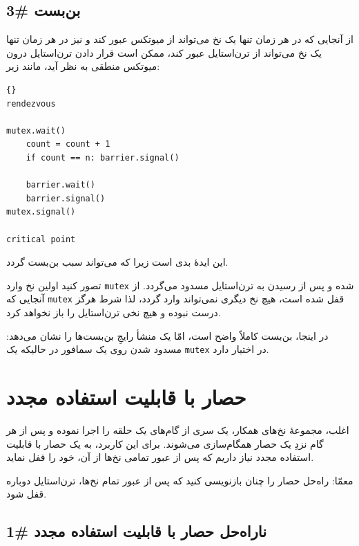 \documentclass{book}
\newcommand{\clearemptydoublepage}{\newpage\cleardoublepage}
\begin{document}
\clearemptydoublepage
\subsection {بن‌بست \#3}

    از آنجایی که در هر زمان تنها یک نخ می‌تواند از میوتکس عبور کند و نیز در هر زمان تنها یک نخ می‌تواند از ترن‌استایل عبور کند، 
    ممکن است قرار دادن ترن‌استایل درون میوتکس منطقی به نظر آید، مانند زیر: 
\begin{latin}
\begin{lstlisting}[title=\rl{راه حل بدِ حصار}]{}
rendezvous

mutex.wait()
    count = count + 1
    if count == n: barrier.signal()

    barrier.wait()
    barrier.signal()
mutex.signal()

critical point
\end{lstlisting}
\end{latin}

    این ایدهٔ بدی است زیرا که می‌تواند سبب بن‌بست گردد. 

    تصور کنید اولین نخ وارد \texttt{mutex} شده و پس از رسیدن به تر‌ن‌استایل مسدود می‌گردد. 
    از آنجایی که \texttt{mutex} قفل شده است، هیچ نخ دیگری نمی‌تواند وارد گردد، لذا شرط 
     هرگز درست نبوده و هیچ نخی ترن‌استایل را باز نخواهد کرد. 

    در اینجا، بن‌بست کاملاً واضح است، امّا یک منشأ رایجِ بن‌بست‌ها را نشان می‌دهد: مسدود شدن روی یک سمافور در حالیکه یک \texttt{mutex} در اختیار دارد. 

\section {حصار با قابلیت استفاده مجدد}
\label{rebar}

    اغلب، مجموعهٔ نخ‌های همکار، یک سری از گام‌های یک حلقه را اجرا نموده و پس از هر گام نزدِ یک حصار همگام‌سازی می‌شوند.
    برای این کاربرد، به یک حصار با قابلیت استفاده مجدد نیاز داریم که پس از عبور تمامی نخ‌ها از آن، خود را قفل نماید.  

    معمّا: راه‌حل حصار را چنان بازنویسی کنید که پس از عبور تمام نخ‌ها، ترن‌استایل دوباره قفل شود.

\clearemptydoublepage
\subsection{ ناراه‌حل حصار با قابلیت استفاده مجدد  \#1}
\end{document}
